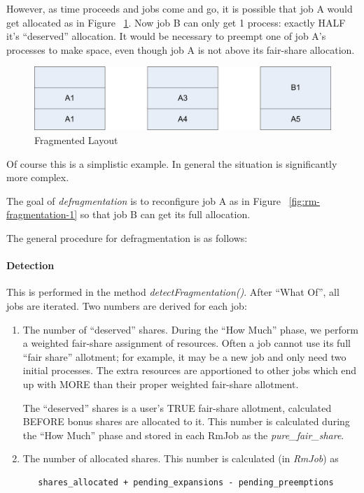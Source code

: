   However, as time proceeds and jobs come and go, it is possible that job A would get
  allocated as in Figure ~\ref{fig:rm-fragmentation-2}.  Now job B can only get 1 process: exactly HALF it's
  ``deserved'' allocation.  It would be necessary to preempt one of job A's processes to make space,
  even though job A is not above its fair-share allocation.

    \begin{figure}[H]
      \centering
      \includegraphics[width=5.5in]{images/ducc-internals/rm-structure-2.png}
      \caption{Fragmented Layout}
      \label{fig:rm-fragmentation-2}
    \end{figure}

  Of course this is a simplistic example.  In general the situation is significantly more complex.

  The goal of {\em defragmentation} is to reconfigure job A as in Figure ~\ref{fig:rm-fragmentation-1} so that
  job B can get its full allocation.

  The general procedure for defragmentation is as follows:

  \paragraph{Detection} This is performed in the method {\em detectFragmentation()}.
  After ``What Of'', all jobs are iterated.  Two numbers  are derived for each job:
  \begin{enumerate}
    \item The number of ``deserved'' shares.  During the ``How Much'' phase, 
      we perform a weighted fair-share assignment of resources. Often a job
      cannot use its full ``fair share'' allotment; for example, it may be a 
      new job and only need two initial processes.  The extra resources are
      apportioned to other jobs which end up with MORE than their proper
      weighted fair-share allotment.

      The ``deserved'' shares is a user's TRUE fair-share allotment, 
      calculated BEFORE bonus shares are allocated to it.  This number is
      calculated during the ``How Much'' phase and stored in each RmJob as
      the {\em pure\_fair\_share}.

    \item The number of allocated shares.  This number is calculated (in {\em RmJob}) as
\begin{verbatim}
   shares_allocated + pending_expansions - pending_preemptions
\end{verbatim}
    \end{enumerate}

